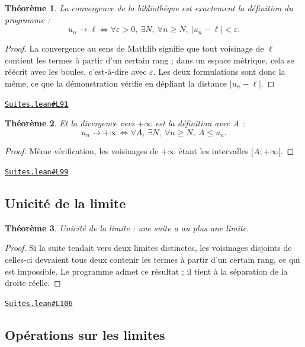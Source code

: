 \documentclass[11pt,a4paper]{article}
\theoremstyle{definition}
\theoremstyle{plain}
\newtheorem{theoreme}{Théorème}
\newcommand{\source}[2]{\par\smallskip\noindent\hfill{\footnotesize\href{#1}{\texttt{#2}}}\par\smallskip}
\begin{document}
\begin{theoreme}
La convergence de la bibliothèque est exactement la définition du programme :
\[ u_n \to \ell \iff \forall \varepsilon > 0,\ \exists N,\ \forall n \ge N,\
   |u_n - \ell| < \varepsilon . \]
\end{theoreme}

\begin{proof}
La convergence au sens de Mathlib signifie que tout voisinage de $\ell$ contient les
termes à partir d'un certain rang ; dans un espace métrique, cela se réécrit avec les
boules, c'est-à-dire avec $\varepsilon$. Les deux formulations sont donc la même, ce que
la démonstration vérifie en dépliant la distance $|u_n - \ell|$.
\end{proof}
\source{https://github.com/Commutator-IO/learn-lean/blob/main/cours/02-lycee/03-suites/Suites.lean\#L91}{Suites.lean\#L91}

\begin{theoreme}
Et la divergence vers $+\infty$ est la définition avec $A$ :
\[ u_n \to +\infty \iff \forall A,\ \exists N,\ \forall n \ge N,\ A \le u_n . \]
\end{theoreme}

\begin{proof}
Même vérification, les voisinages de $+\infty$ étant les intervalles $[A ; +\infty[$.
\end{proof}
\source{https://github.com/Commutator-IO/learn-lean/blob/main/cours/02-lycee/03-suites/Suites.lean\#L99}{Suites.lean\#L99}

\subsection{Unicité de la limite}

\begin{theoreme}
Unicité de la limite : une suite a au plus une limite.
\end{theoreme}

\begin{proof}
Si la suite tendait vers deux limites distinctes, les voisinages disjoints de celles-ci
devraient tous deux contenir les termes à partir d'un certain rang, ce qui est impossible.
Le programme admet ce résultat ; il tient à la séparation de la droite réelle.
\end{proof}
\source{https://github.com/Commutator-IO/learn-lean/blob/main/cours/02-lycee/03-suites/Suites.lean\#L106}{Suites.lean\#L106}

\subsection{Opérations sur les limites}
\end{document}

